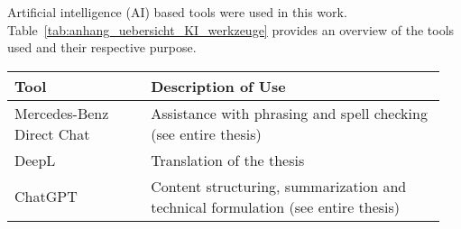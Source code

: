 \setcounter{chapter}{1}

Artificial intelligence (AI) based tools were used in this work. Table~\ref{tab:anhang_uebersicht_KI_werkzeuge} provides an overview of the tools used and their respective purpose.

\begin{table}[hbt]	
	\centering
	\renewcommand{\arraystretch}{1.5}	%
	\label{tab:appendix_overview_AI_tools}
	\begin{tabular}{>{\raggedright\arraybackslash}p{0.3\linewidth} >{\raggedright\arraybackslash}p{0.65\linewidth}}
		\textbf{Tool} & \textbf{Description of Use}\\
		\hline 
		\hline
		Mercedes-Benz Direct Chat & Assistance with phrasing and spell checking (see entire thesis) \\
		DeepL & Translation of the thesis \\
		ChatGPT & Content structuring, summarization and technical formulation (see entire thesis) \\
	\end{tabular} 
\end{table}







